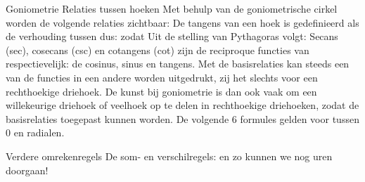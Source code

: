 \documentclass[11pt,a4paper]{amsart}
\begin{document}
Goniometrie
Relaties tussen hoeken
Met behulp van de goniometrische cirkel worden de volgende relaties zichtbaar:
De tangens van een hoek is gedefinieerd als de verhouding tussen
 dus:
zodat
Uit de stelling van Pythagoras volgt:
Secans (sec), cosecans (csc) en cotangens (cot) zijn de reciproque functies van
respectievelijk: de cosinus, sinus en tangens.
Met de basisrelaties kan steeds een van de functies in een andere worden
uitgedrukt, zij het slechts voor een rechthoekige driehoek. De kunst bij
goniometrie is dan ook vaak om een willekeurige driehoek of veelhoek op te 
delen in rechthoekige driehoeken, zodat de basisrelaties toegepast kunnen 
worden. De volgende 6 formules gelden voor  tussen 0 en  radialen.

Verdere omrekenregels
De som- en verschilregels:
en zo kunnen we nog uren doorgaan!
 
\end{document}
